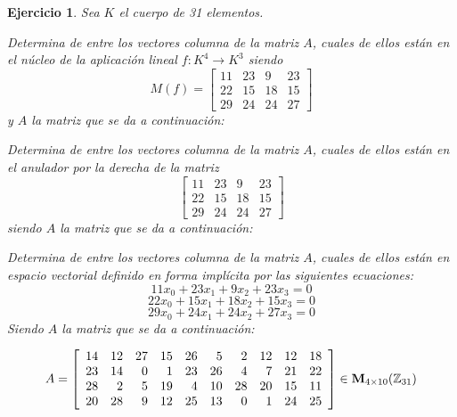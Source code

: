 \documentclass[12pt]{amsart}
\newtheorem{ejer}{Ejercicio}
\begin{document}
\begin{ejer} Sea $K$ el cuerpo de 31 elementos.
\newline
\noindent\begin{minipage}{\textwidth}
\begin{tcolorbox}[colback = green!20!white,title=Versión Núcleo]
Determina de entre los vectores columna de la matriz $A$, cuales de ellos están en el núcleo de la aplicación lineal $f:K^{4} \to K^{3}$ siendo  $$ M(f) = \left[\begin{array}{rrrr}
11 & 23 & 9 & 23 \\
22 & 15 & 18 & 15 \\
29 & 24 & 24 & 27
\end{array}\right] $$ y $A$ la matriz que se da a continuación:\end{tcolorbox}
\end{minipage} \newline
\noindent\begin{minipage}{\textwidth}
\begin{tcolorbox}[colback = blue!20!white,title=Versión Anulador]
Determina de entre los vectores columna de la matriz $A$, cuales de ellos están en el anulador por la derecha de la matriz $$ \left[\begin{array}{rrrr}
11 & 23 & 9 & 23 \\
22 & 15 & 18 & 15 \\
29 & 24 & 24 & 27
\end{array}\right] $$ siendo $A$ la matriz que se da a continuación:\end{tcolorbox}
\end{minipage} \newline
\noindent\begin{minipage}{\textwidth} 
\begin{tcolorbox}[colback = red!20!white,title=Versión Ecuaciones Implícitas]
Determina de entre los vectores columna de la matriz $A$, cuales de ellos están en espacio vectorial definido en forma implícita por las siguientes ecuaciones:
\[ 11 x_{0} + 23 x_{1} + 9 x_{2} + 23 x_{3} = 0 \]
\[ 22 x_{0} + 15 x_{1} + 18 x_{2} + 15 x_{3} = 0 \]
\[ 29 x_{0} + 24 x_{1} + 24 x_{2} + 27 x_{3} = 0 \]
Siendo $A$ la matriz que se da a continuación:
\end{tcolorbox}
\end{minipage}
\[ A = \left[\begin{array}{rrrrrrrrrr}
14 & 12 & 27 & 15 & 26 & 5 & 2 & 12 & 12 & 18 \\
23 & 14 & 0 & 1 & 23 & 26 & 4 & 7 & 21 & 22 \\
28 & 2 & 5 & 19 & 4 & 10 & 28 & 20 & 15 & 11 \\
20 & 28 & 9 & 12 & 25 & 13 & 0 & 1 & 24 & 25
\end{array}\right] \in {\bf M}_{4\times 10}({\mathbb Z}_{31})\]
\end{ejer}
\end{document}
